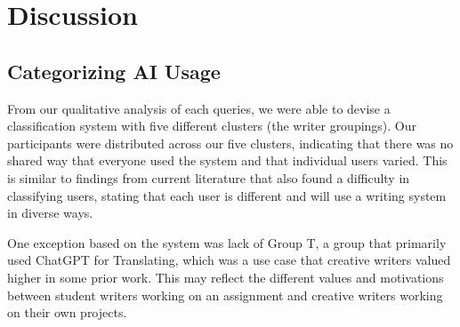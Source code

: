 \documentclass[manuscript,screen,acmsmall]{acmart}
\begin{document}
    
    \section{Discussion}
    \subsection{Categorizing AI Usage}
    
    From our qualitative analysis of each queries, we were able to devise a classification system with five different clusters (the writer groupings).
    Our participants were distributed across our five clusters, indicating that there was no shared way that everyone used the system and that individual users varied.
    This is similar to findings from current literature that also found a difficulty in classifying users, stating that each user is different and will use a writing system in diverse ways. 

    One exception based on the system was lack of Group T, a group that primarily used ChatGPT for Translating, which was a use case that creative writers valued higher in some prior work.
    This may reflect the different values and motivations between student writers working on an assignment and creative writers working on their own projects.

\end{document}
